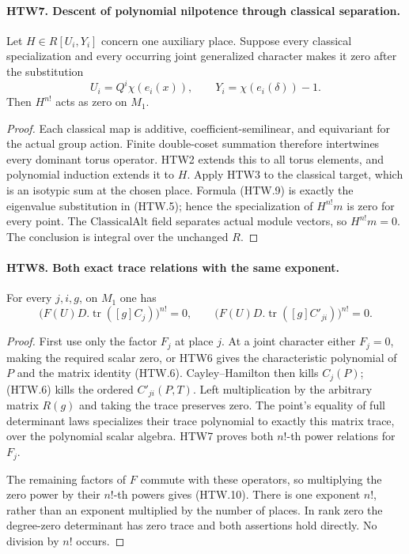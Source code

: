 
\paragraph{HTW7. Descent of polynomial nilpotence through classical separation.}
\label{claim:HTW7}
Let \(H\in R[U_i,Y_i]\) concern one auxiliary place.
Suppose every classical specialization and every occurring
joint generalized character makes it zero after the
substitution
\[
 U_i=Q^i\chi(e_i(x)),\qquad
 Y_i=\chi(e_i(\delta))-1 .
 \tag{HTW.9}
\]
Then \(H^{n!}\) acts as zero on \(M_1\).
\begin{proof}
Each classical map is additive, coefficient-semilinear,
and equivariant for the actual group action.  Finite
double-coset summation therefore intertwines every
dominant torus operator.  HTW2 extends this to all torus
elements, and polynomial induction extends it to \(H\).
Apply HTW3 to the classical target, which is an isotypic
sum at the chosen place.  Formula (HTW.9) is exactly
the eigenvalue substitution in (HTW.5); hence the
specialization of \(H^{n!}m\) is zero for every point.
The \(\mathrm{ClassicalAlt}\) field separates actual
module vectors, so \(H^{n!}m=0\).  The conclusion is
integral over the unchanged \(R\).
\end{proof}

\paragraph{HTW8. Both exact trace relations with the same exponent.}
\label{claim:HTW8}
For every \(j,i,g\), on \(M_1\) one has
\[
 \big(F(U)D.\operatorname{tr}([g]C_j)\big)^{n!}=0,\qquad
 \big(F(U)D.\operatorname{tr}([g]C'_{ji})\big)^{n!}=0 .
 \tag{HTW.10}
\]
\begin{proof}
First use only the factor \(F_j\) at place \(j\).
At a joint character either \(F_j=0\), making the
required scalar zero, or HTW6 gives the characteristic
polynomial of \(P\) and the matrix identity (HTW.6).
Cayley--Hamilton then kills \(C_j(P)\); (HTW.6) kills
the ordered \(C'_{ji}(P,T)\).  Left multiplication
by the arbitrary matrix \(R(g)\) and taking the trace
preserves zero.  The point's equality of full determinant
laws specializes their trace polynomial to exactly this
matrix trace, over the polynomial scalar algebra.
HTW7 proves both \(n!\)-th power relations for \(F_j\).

The remaining factors of \(F\) commute with these
operators, so multiplying the zero power by their
\(n!\)-th powers gives (HTW.10).  There is one
exponent \(n!\), rather than an exponent multiplied by
the number of places.  In rank zero the degree-zero
determinant has zero trace and both assertions hold
directly.  No division by \(n!\) occurs.
\end{proof}


